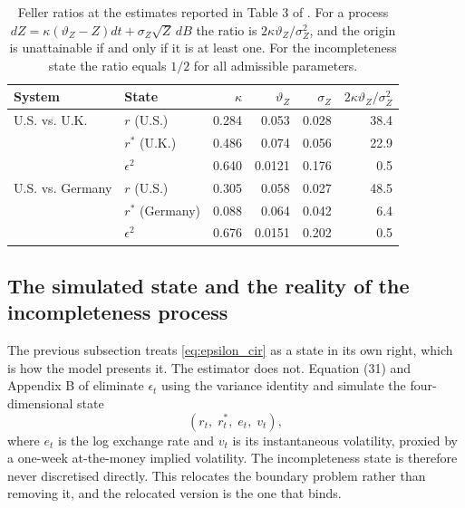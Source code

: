 \documentclass[11pt]{article}
\theoremstyle{definition}
\begin{document}
\begin{table}[t]
\centering
\caption{Feller ratios at the estimates reported in Table 3 of \citet{BrandtSantaClara2002}. For a process $dZ=\kappa(\vartheta_Z-Z)dt+\sigma_Z\sqrt Z\,dB$ the ratio is $2\kappa\vartheta_Z/\sigma_Z^2$, and the origin is unattainable if and only if it is at least one. For the incompleteness state the ratio equals $1/2$ for all admissible parameters.}
\label{tab:feller}
\begin{tabular}{llrrrr}
\toprule
System & State & $\kappa$ & $\vartheta_Z$ & $\sigma_Z$ & $2\kappa\vartheta_Z/\sigma_Z^2$ \\
\midrule
U.S. vs. U.K. & $r$ (U.S.) & 0.284 & 0.053 & 0.028 & 38.4 \\
              & $r^*$ (U.K.) & 0.486 & 0.074 & 0.056 & 22.9 \\
              & $\epsilon^2$ & 0.640 & 0.0121 & 0.176 & 0.5 \\
U.S. vs. Germany & $r$ (U.S.) & 0.305 & 0.058 & 0.027 & 48.5 \\
              & $r^*$ (Germany) & 0.088 & 0.064 & 0.042 & 6.4 \\
              & $\epsilon^2$ & 0.676 & 0.0151 & 0.202 & 0.5 \\
\bottomrule
\end{tabular}
\end{table}

\subsection{The simulated state and the reality of the incompleteness process}\label{sec:simulated_state}

The previous subsection treats \eqref{eq:epsilon_cir} as a state in its own right, which is how the model presents it. The estimator does not. Equation (31) and Appendix B of \citet{BrandtSantaClara2002} eliminate $\epsilon_t$ using the variance identity and simulate the four-dimensional state
\begin{equation}\label{eq:simulated_state}
(r_t,\;r_t^*,\;e_t,\;v_t),
\end{equation}
where $e_t$ is the log exchange rate and $v_t$ is its instantaneous volatility, proxied by a one-week at-the-money implied volatility. The incompleteness state is therefore never discretised directly. This relocates the boundary problem rather than removing it, and the relocated version is the one that binds.
\end{document}
